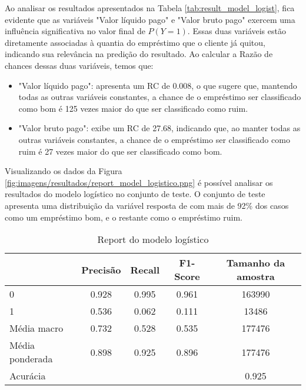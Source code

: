 Ao analisar os resultados apresentados na Tabela \ref{tab:result_model_logist}, fica evidente
que as variáveis "Valor líquido pago" e "Valor bruto pago" exercem uma influência significativa no valor final de $P(Y=1)$.
Essas duas variáveis estão diretamente associadas à quantia do empréstimo que o cliente já quitou, 
indicando sua relevância na predição do resultado. Ao calcular a Razão de chances dessas duas variáveis, temos que:


\begin{itemize}
  \item "Valor líquido pago": apresenta um RC de 0.008, o que sugere que, mantendo todas as outras variáveis constantes, a chance de o empréstimo ser classificado como bom é 125 vezes maior do que ser classificado como ruim.
  \item "Valor bruto pago": exibe um RC de 27.68, indicando que, ao manter todas as outras variáveis constantes, a chance de o empréstimo ser classificado como ruim é 27 vezes maior do que ser classificado como bom.
\end{itemize}



Visualizando os dados da Figura \ref{fig:imagens/resultados/report_model_logistico.png} é possível analisar 
os resultados do modelo logístico no conjunto de teste. O conjunto de teste apresenta uma distribuição da variável 
resposta de com mais de 92\% dos casos como um empréstimo bom, e o restante como o empréstimo ruim.


\begin{table}[H]
\centering
\begin{tabular}{lcccc}
  \hline
                &    \textbf{Precisão} & \textbf{Recall}    &   \textbf{F1-Score} &  \textbf{Tamanho da amostra} \\
  \hline
   0               &    0.928 & 0.995  &   0.961 & 163990        \\
   1               &    0.536 & 0.062 &   0.111 & 13486        \\
   Média macro     &    0.732 & 0.528  &   0.535 & 177476        \\
   Média ponderada &    0.898 & 0.925  &   0.896 & 177476        \\
   \hline
   Acurácia     &             &           &    &  0.925\\

  \hline
\end{tabular}
\caption{Report do modelo logístico}
\label{tab:report_logist_model}
\end{table}


